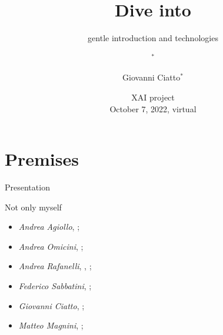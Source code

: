 \documentclass[presentation]{beamer}\mode<presentation>{\usetheme{AMSBolognaFC}}
\title[Dive into \skeski]
{Dive into \longskeski}
\subtitle[gentle introduction and technologies]
{gentle introduction and technologies}
\author[\sspeaker{Magnini et al.} ]
{\speaker{Matteo Magnini}$^{*}$ \and Giovanni Ciatto$^{*}$}
\institute[DISI, Univ.\ Bologna]
{
    $^{*}$Dipartimento di Informatica -- Scienza e Ingegneria (DISI)\\\textsc{Alma Mater Studiorum} -- Universit{\`a} di Bologna
    \\
    \{\speaker{matteo.magnini}, giovanni.ciatto\}@unibo.it %
}
\date[XAI project]{XAI project\\October 7, 2022, virtual}
\begin{document}

\frame{\titlepage}

%


\section{Premises}

\begin{frame}[c]{Presentation}
    
    \begin{block}{Not only myself}
        \begin{itemize}
            \item \emph{Andrea Agiollo}, \unibo{} \disi{};
            \item \emph{Andrea Omicini}, \unibo{} \disi{};
            \item \emph{Andrea Rafanelli}, \unipi{} \di{}, \uniaq{} \disim{};
            \item \emph{Federico Sabbatini}, \uniurb{} \dispea{};
            \item \emph{Giovanni Ciatto}, \unibo{} \disi{};
            \item \emph{Matteo Magnini}, \unibo{} \disi{};
        \end{itemize}
    \end{block}

\end{frame}
\end{document}
